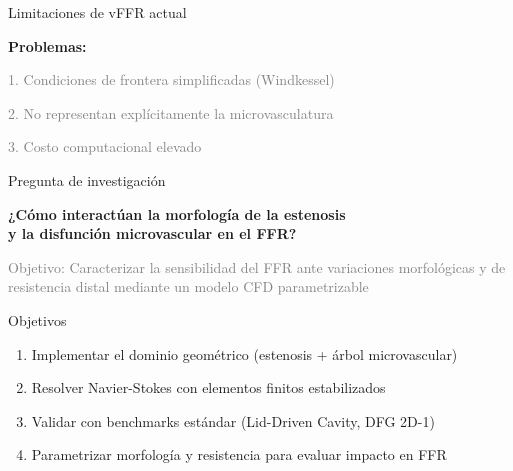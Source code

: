 \documentclass[aspectratio=169, 11pt]{beamer}
\begin{document}
\begin{frame}{Limitaciones de vFFR actual}

  \centering
  \vfill
  \textbf{Problemas:}
  \vspace{0.3cm}

  \textcolor{gray}{1. Condiciones de frontera simplificadas (Windkessel)}

  \vspace{0.15cm}
  \textcolor{gray}{2. No representan explícitamente la microvasculatura}

  \vspace{0.15cm}
  \textcolor{gray}{3. Costo computacional elevado}
  \vfill
\end{frame}

\begin{frame}{Pregunta de investigación}

  \centering
  \vfill
  {\large\textbf{¿Cómo interactúan la morfología de la estenosis\\ y la disfunción microvascular en el FFR?}}

  \vspace{0.5cm}
  \textcolor{gray}{\small Objetivo: Caracterizar la sensibilidad del FFR ante variaciones morfológicas y de resistencia distal mediante un modelo CFD parametrizable}
  \vfill
\end{frame}

\begin{frame}{Objetivos}
  \begin{enumerate}
    \item {\color{gray} Implementar el dominio geométrico (estenosis + árbol microvascular)}
    \item {\color{gray} Resolver Navier-Stokes con elementos finitos estabilizados}
    \item {\color{gray} Validar con benchmarks estándar (Lid-Driven Cavity, DFG 2D-1)}
    \item {\color{gray} Parametrizar morfología y resistencia para evaluar impacto en FFR}
  \end{enumerate}
\end{frame}
\end{document}
